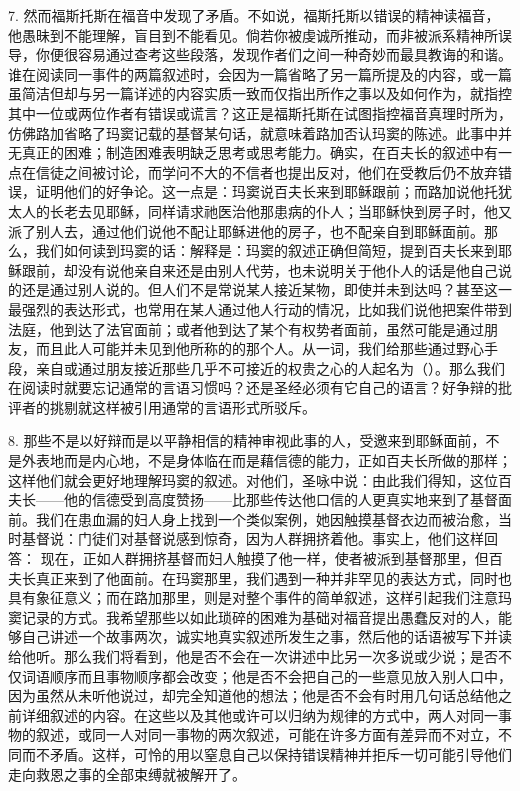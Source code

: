 7. 然而福斯托斯在福音中发现了矛盾。不如说，福斯托斯以错误的精神读福音，他愚昧到不能理解，盲目到不能看见。倘若你被虔诚所推动，而非被派系精神所误导，你便很容易通过查考这些段落，发现作者们之间一种奇妙而最具教诲的和谐。谁在阅读同一事件的两篇叙述时，会因为一篇省略了另一篇所提及的内容，或一篇虽简洁但却与另一篇详述的内容实质一致而仅指出所作之事以及如何作为，就指控其中一位或两位作者有错误或谎言？这正是福斯托斯在试图指控福音真理时所为，仿佛路加省略了玛窦记载的基督某句话，就意味着路加否认玛窦的陈述。此事中并无真正的困难；制造困难表明缺乏思考或思考能力。确实，在百夫长的叙述中有一点在信徒之间被讨论，而学问不大的不信者也提出反对，他们在受教后仍不放弃错误，证明他们的好争论。这一点是：玛窦说百夫长来到耶稣跟前；而路加说他托犹太人的长老去见耶稣，同样请求祂医治他那患病的仆人；当耶稣快到房子时，他又派了别人去，通过他们说他不配让耶稣进他的房子，也不配亲自到耶稣面前。那么，我们如何读到玛窦的话：解释是：玛窦的叙述正确但简短，提到百夫长来到耶稣跟前，却没有说他亲自来还是由别人代劳，也未说明关于他仆人的话是他自己说的还是通过别人说的。但人们不是常说某人接近某物，即使并未到达吗？甚至这一最强烈的表达形式，也常用在某人通过他人行动的情况，比如我们说他把案件带到法庭，他到达了法官面前；或者他到达了某个有权势者面前，虽然可能是通过朋友，而且此人可能并未见到他所称的的那个人。从一词，我们给那些通过野心手段，亲自或通过朋友接近那些几乎不可接近的权贵之心的人起名为（）。那么我们在阅读时就要忘记通常的言语习惯吗？还是圣经必须有它自己的语言？好争辩的批评者的挑剔就这样被引用通常的言语形式所驳斥。\par

8. 那些不是以好辩而是以平静相信的精神审视此事的人，受邀来到耶稣面前，不是外表地而是内心地，不是身体临在而是藉信德的能力，正如百夫长所做的那样；这样他们就会更好地理解玛窦的叙述。对他们，圣咏中说：由此我们得知，这位百夫长——他的信德受到高度赞扬——比那些传达他口信的人更真实地来到了基督面前。我们在患血漏的妇人身上找到一个类似案例，她因触摸基督衣边而被治愈，当时基督说：门徒们对基督说感到惊奇，因为人群拥挤着他。事实上，他们这样回答： 现在，正如人群拥挤基督而妇人触摸了他一样，使者被派到基督那里，但百夫长真正来到了他面前。在玛窦那里，我们遇到一种并非罕见的表达方式，同时也具有象征意义；而在路加那里，则是对整个事件的简单叙述，这样引起我们注意玛窦记录的方式。我希望那些以如此琐碎的困难为基础对福音提出愚蠢反对的人，能够自己讲述一个故事两次，诚实地真实叙述所发生之事，然后他的话语被写下并读给他听。那么我们将看到，他是否不会在一次讲述中比另一次多说或少说；是否不仅词语顺序而且事物顺序都会改变；他是否不会把自己的一些意见放入别人口中，因为虽然从未听他说过，却完全知道他的想法；他是否不会有时用几句话总结他之前详细叙述的内容。在这些以及其他或许可以归纳为规律的方式中，两人对同一事物的叙述，或同一人对同一事物的两次叙述，可能在许多方面有差异而不对立，不同而不矛盾。这样，可怜的用以窒息自己以保持错误精神并拒斥一切可能引导他们走向救恩之事的全部束缚就被解开了。\par

